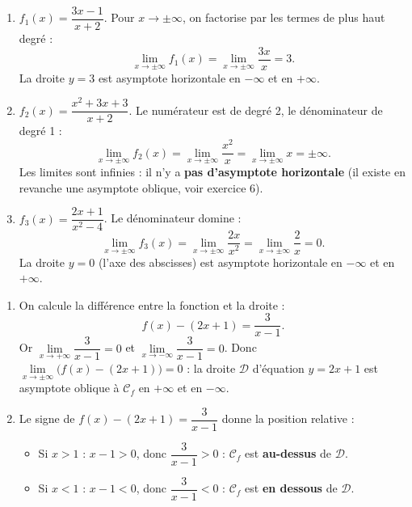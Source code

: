 \documentclass[11pt]{article}
\newcommand{\cle}[1]{{\popxbold\color{popdark}#1}}
\begin{document}
\begin{corrige}
\begin{enumerate}
\item $f_1(x)=\dfrac{3x-1}{x+2}$. Pour $x\to\pm\infty$, on factorise par les termes de plus haut degré :
\[ \lim_{x\to\pm\infty}f_1(x)=\lim_{x\to\pm\infty}\frac{3x}{x}=3. \]
La droite $y=3$ est asymptote horizontale en $-\infty$ et en $+\infty$.

\item $f_2(x)=\dfrac{x^2+3x+3}{x+2}$. Le numérateur est de degré 2, le dénominateur de degré 1 :
\[ \lim_{x\to\pm\infty}f_2(x)=\lim_{x\to\pm\infty}\frac{x^2}{x}=\lim_{x\to\pm\infty}x=\pm\infty. \]
Les limites sont infinies : il n'y a \textbf{pas d'asymptote horizontale} (il existe en revanche une asymptote oblique, voir exercice 6).

\item $f_3(x)=\dfrac{2x+1}{x^2-4}$. Le dénominateur domine :
\[ \lim_{x\to\pm\infty}f_3(x)=\lim_{x\to\pm\infty}\frac{2x}{x^2}=\lim_{x\to\pm\infty}\frac{2}{x}=0. \]
La droite $y=0$ (l'axe des abscisses) est asymptote horizontale en $-\infty$ et en $+\infty$.
\end{enumerate}
\end{corrige}

\begin{corrige}
\begin{enumerate}
\item On calcule la différence entre la fonction et la droite :
\[ f(x)-(2x+1)=\frac{3}{x-1}. \]
Or $\lim\limits_{x\to+\infty}\dfrac{3}{x-1}=0$ et $\lim\limits_{x\to-\infty}\dfrac{3}{x-1}=0$.
Donc $\lim\limits_{x\to\pm\infty}\bigl(f(x)-(2x+1)\bigr)=0$ : la droite $\mathcal{D}$ d'équation $y=2x+1$ est \cle{asymptote oblique} à $\mathcal{C}_f$ en $+\infty$ et en $-\infty$.

\item Le signe de $f(x)-(2x+1)=\dfrac{3}{x-1}$ donne la position relative :
\begin{itemize}
\item Si $x>1$ : $x-1>0$, donc $\dfrac{3}{x-1}>0$ : $\mathcal{C}_f$ est \textbf{au-dessus} de $\mathcal{D}$.
\item Si $x<1$ : $x-1<0$, donc $\dfrac{3}{x-1}<0$ : $\mathcal{C}_f$ est \textbf{en dessous} de $\mathcal{D}$.
\end{itemize}
\end{enumerate}
\end{corrige}
\end{document}
